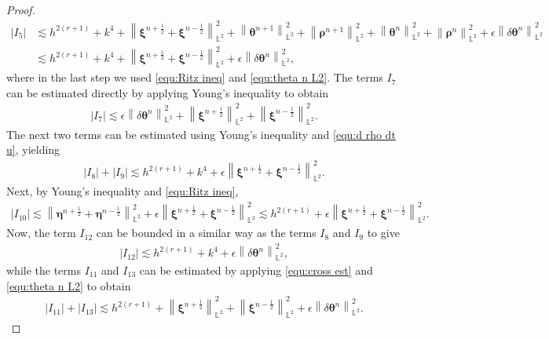 \documentclass[11pt, reqno]{amsart}
\theoremstyle{definition}
\theoremstyle{remark}
\numberwithin{equation}{section}
\newcommand{\bff}{\boldsymbol}
\newcommand{\bb}{\mathbb}
\newcommand{\norm}[2]{\left\|{#1}\right\|_{#2}}
\newcommand{\abs}[1]{\left|{#1}\right|}
\begin{document}
\begin{proof}
\begin{align}\label{equ:I5}
	\nonumber
	\abs{I_5}
	&\lesssim
	h^{2(r+1)}+k^4 + \norm{\bff{\xi}^{n+\frac{1}{2}} + \bff{\xi}^{n-\frac{1}{2}}}{\bb{L}^2}^2 +
	\norm{\bff{\theta}^{n+1}}{\bb{L}^2}^2 + \norm{\bff{\rho}^{n+1}}{\bb{L}^2}^2 
	+ \norm{\bff{\theta}^n}{\bb{L}^2}^2 + \norm{\bff{\rho}^n}{\bb{L}^2}^2
	+ \epsilon \norm{\delta \bff{\theta}^n}{\bb{L}^2}^2
	\\
	&\lesssim
	h^{2(r+1)}+k^4 + \norm{\bff{\xi}^{n+\frac{1}{2}} + \bff{\xi}^{n-\frac{1}{2}}}{\bb{L}^2}^2
	+ \epsilon \norm{\delta \bff{\theta}^n}{\bb{L}^2}^2,
\end{align}
where in the last step we used \eqref{equ:Ritz ineq} and \eqref{equ:theta n L2}.
The terms $I_7$ can be estimated directly by applying Young's inequality to obtain
\begin{align*}
	\abs{I_7}
	\lesssim
	\epsilon \norm{\delta \bff{\theta}^n}{\bb{L}^2}^2 
	+
	\norm{\bff{\xi}^{n+\frac{1}{2}}}{\bb{L}^2}^2 + \norm{\bff{\xi}^{n-\frac{1}{2}}}{\bb{L}^2}^2.
\end{align*}
The next two terms can be estimated using Young's inequality and \eqref{equ:d rho dt u}, yielding
\begin{align*}
	\abs{I_8} + \abs{I_9}
	\lesssim
	h^{2(r+1)}+k^4 + \epsilon \norm{\bff{\xi}^{n+\frac{1}{2}}+\bff{\xi}^{n-\frac{1}{2}}}{\bb{L}^2}^2.
\end{align*}
Next, by Young's inequality and \eqref{equ:Ritz ineq},
\begin{align*}
	\abs{I_{10}}
	\lesssim
	\norm{\bff{\eta}^{n+\frac{1}{2}}+\bff{\eta}^{n-\frac{1}{2}}}{\bb{L}^2}^2
	+
	\epsilon \norm{\bff{\xi}^{n+\frac{1}{2}}+\bff{\xi}^{n-\frac{1}{2}}}{\bb{L}^2}^2
	\lesssim
	h^{2(r+1)} + \epsilon \norm{\bff{\xi}^{n+\frac{1}{2}}+\bff{\xi}^{n-\frac{1}{2}}}{\bb{L}^2}^2.
\end{align*}
Now, the term $I_{12}$ can be bounded in a similar way as the terms $I_8$ and $I_9$ to give
\begin{align*}
	\abs{I_{12}}
	\lesssim
	h^{2(r+1)}+k^4 + \epsilon \norm{\delta \bff{\theta}^n}{\bb{L}^2}^2,
\end{align*}
while the terms $I_{11}$ and $I_{13}$ can be estimated by applying \eqref{equ:cross est} and \eqref{equ:theta n L2} to obtain
\begin{align*}
	\abs{I_{11}}+\abs{I_{13}}
	\lesssim
	h^{2(r+1)} + \norm{\bff{\xi}^{n+\frac{1}{2}}}{\bb{L}^2}^2
	+ \norm{\bff{\xi}^{n-\frac{1}{2}}}{\bb{L}^2}^2 + \epsilon \norm{\delta \bff{\theta}^n}{\bb{L}^2}^2.
\end{align*}

\end{proof}
\end{document}

